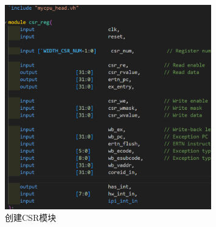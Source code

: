 \documentclass[12pt,a4paper]{article}
\begin{document}
            \begin{figure}[H]
                \centering
                \includegraphics[width=0.8\textwidth,height=0.4\textheight]{修改头文件.png}
                \caption{创建CSR模块}
            \end{figure}
\end{document}
